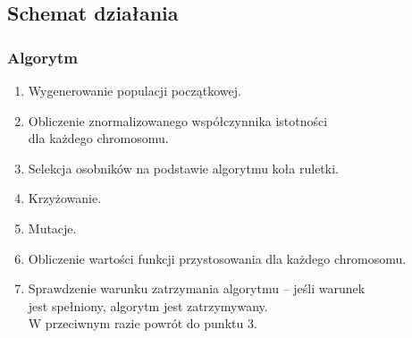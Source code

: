 \documentclass[10pt]{beamer}
\begin{document}
\subsection{Schemat działania}
\begin{frame}
\frametitle{Algorytm}
\begin{spacing}{1.3}
\begin{flushleft}
\begin{enumerate}[1.]
\item Wygenerowanie populacji początkowej.
\item Obliczenie znormalizowanego współczynnika istotności\\
dla każdego chromosomu.
\item Selekcja osobników na podstawie algorytmu koła ruletki.
\item Krzyżowanie.
\item Mutacje.
\item Obliczenie wartości funkcji przystosowania dla każdego chromosomu.
\item Sprawdzenie warunku zatrzymania algorytmu -- jeśli warunek\\
jest spełniony, algorytm jest zatrzymywany.\\
W przeciwnym razie powrót do punktu 3.
\end{enumerate}
\end{flushleft}
\end{spacing}

\end{frame}

\end{document}
